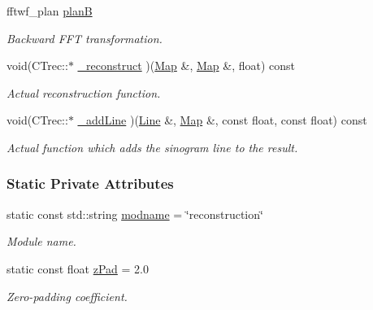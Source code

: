 \begin{DoxyCompactItemize}
fftwf\_\-plan \hyperlink{classCTrec_a963a0669b7a3c59119085639f660b154}{planB}
\begin{DoxyCompactList}\small\item\em Backward FFT transformation. \item\end{DoxyCompactList}\item 
void(CTrec::$\ast$ \hyperlink{classCTrec_a09c82f115c45c386250a68cd0d8d957b}{\_\-reconstruct} )(\hyperlink{group__Types_ga8747378c016fc11d9ecbb98787248c25}{Map} \&, \hyperlink{group__Types_ga8747378c016fc11d9ecbb98787248c25}{Map} \&, float) const 
\begin{DoxyCompactList}\small\item\em Actual reconstruction function. \item\end{DoxyCompactList}\item 
void(CTrec::$\ast$ \hyperlink{classCTrec_aff1a740cb831c50dceca306fe47c6062}{\_\-addLine} )(\hyperlink{group__Types_ga4ce3fdeba27702c8b09a141e22709e38}{Line} \&, \hyperlink{group__Types_ga8747378c016fc11d9ecbb98787248c25}{Map} \&, const float, const float) const 
\begin{DoxyCompactList}\small\item\em Actual function which adds the sinogram line to the result. \item\end{DoxyCompactList}\end{DoxyCompactItemize}
\subsubsection*{Static Private Attributes}
\begin{DoxyCompactItemize}
\item 
static const std::string \hyperlink{classCTrec_ad29b8e1dff3171ec14f60658204c8de5}{modname} = \char`\"{}reconstruction\char`\"{}
\begin{DoxyCompactList}\small\item\em Module name. \item\end{DoxyCompactList}\item 
static const float \hyperlink{classCTrec_ac13bcb5f9e53622aa19d440684fa7273}{zPad} = 2.0
\begin{DoxyCompactList}\small\item\em Zero-\/padding coefficient. \item\end{DoxyCompactList}\end{DoxyCompactItemize}


